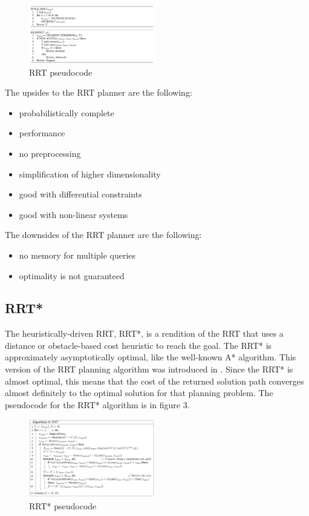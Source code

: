 \documentclass[conference]{IEEEtran} \usepackage[T1]{fontenc} \usepackage[backend=biber, style=ieee]{biblatex}
\begin{document}
\begin{figure}
\label{figure2} 
\centering 
\includegraphics[width=0.49\textwidth]{rrt}
\caption{RRT pseudocode}
\end{figure}

The upsides to the RRT planner are the following:
\begin{itemize}
\item probabilistically complete
\item performance
\item no preprocessing
\item simplification of higher dimensionality
\item good with differential constraints
\item good with non-linear systems
\end{itemize}

The downsides of the RRT planner are the following:
\begin{itemize}
\item no memory for multiple queries
\item optimality is not guaranteed
\end{itemize}

\subsection{RRT*} \label{RRT*}
The heuristically-driven RRT, RRT*, is a rendition of the RRT that uses a distance or obstacle-based cost heuristic to reach the goal. The RRT* is approximately 
asymptotically optimal, like the well-known A* algorithm. This version of the RRT planning algorithm was introduced in \cite{sampling_star}. Since the RRT* is almost
optimal, this means that the cost of the returned solution path converges almost definitely to the optimal solution for that planning problem. The pseudocode for the
RRT* algorithm is in figure 3.

\begin{figure}
\label{figure3} 
\centering 
\includegraphics[width=0.49\textwidth]{rrt_star}
\caption{RRT* pseudocode}
\end{figure}
\end{document}
